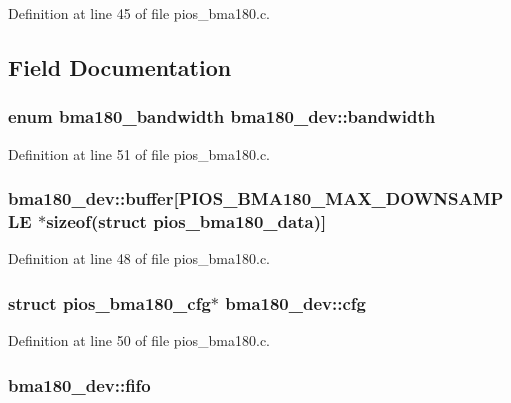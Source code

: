 Definition at line 45 of file pios\-\_\-bma180.\-c.



\subsection{Field Documentation}
\hypertarget{structbma180__dev_ac532f2e8a6bae6b073f5491851d59293}{
\subsubsection[{bandwidth}]{\setlength{\rightskip}{0pt plus 5cm}enum {\bf bma180\-\_\-bandwidth} bma180\-\_\-dev\-::bandwidth}}\label{structbma180__dev_ac532f2e8a6bae6b073f5491851d59293}


Definition at line 51 of file pios\-\_\-bma180.\-c.

\hypertarget{structbma180__dev_ab15069f2ae1a91840b59b781df64d014}{
\subsubsection[{buffer}]{ bma180\-\_\-dev\-::buffer\mbox{[}P\-I\-O\-S\-\_\-\-B\-M\-A180\-\_\-\-M\-A\-X\-\_\-\-D\-O\-W\-N\-S\-A\-M\-P\-L\-E $\ast$sizeof(struct {\bf pios\-\_\-bma180\-\_\-data})\mbox{]}}}\label{structbma180__dev_ab15069f2ae1a91840b59b781df64d014}


Definition at line 48 of file pios\-\_\-bma180.\-c.

\hypertarget{structbma180__dev_ad7ed883d14d9f455e17d12157471501d}{
\subsubsection[{cfg}]{\setlength{\rightskip}{0pt plus 5cm}struct {\bf pios\-\_\-bma180\-\_\-cfg}$\ast$ bma180\-\_\-dev\-::cfg}}\label{structbma180__dev_ad7ed883d14d9f455e17d12157471501d}


Definition at line 50 of file pios\-\_\-bma180.\-c.

\hypertarget{structbma180__dev_a5ea7560cd48ca5ad1fc285a2ff3084c8}{
\subsubsection[{fifo}]{ bma180\-\_\-dev\-::fifo}}\label{structbma180__dev_a5ea7560cd48ca5ad1fc285a2ff3084c8}


